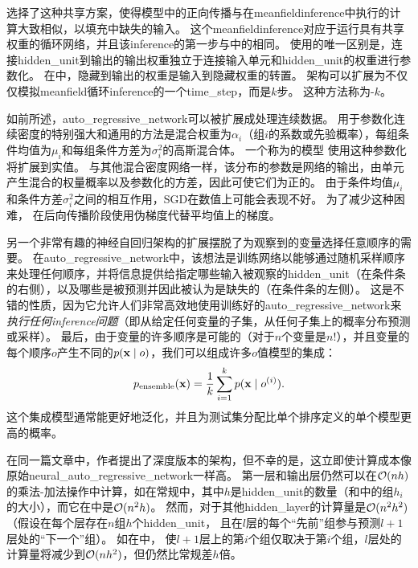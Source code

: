 
\citet{Larochelle+Murray-2011-small} 选择了这种共享方案，使得模型中的正向传播与在\gls{meanfield}\gls{inference}中执行的计算大致相似，以填充中缺失的输入。
这个\gls{meanfield}\gls{inference}对应于运行具有共享权重的循环网络，并且该\gls{inference}的第一步与中的相同。
使用的唯一区别是，连接\gls{hidden_unit}到输出的输出权重独立于连接输入单元和\gls{hidden_unit}的权重进行参数化。
在中，隐藏到输出的权重是输入到隐藏权重的转置。
架构可以扩展为不仅仅模拟\gls{meanfield}循环\gls{inference}的一个\gls{time_step}，而是$k$步。
这种方法称为-$k$\citep{Raiko-et-al-2014}。


如前所述，\gls{auto_regressive_network}可以被扩展成处理连续数据。
用于参数化连续密度的特别强大和通用的方法是混合权重为$\alpha_i$（组$i$的系数或先验概率），每组条件均值为$\mu_i$和每组条件方差为$\sigma_i^2$的高斯混合体。
一个称为的模型\citep{Benigno-et-al-NIPS2013-small} 使用这种参数化将扩展到实值。
与其他混合密度网络一样，该分布的参数是网络的输出，由单元产生混合的权量概率以及参数化的方差，因此可使它们为正的。
由于条件均值$\mu_i$和条件方差$\sigma_i^2$之间的相互作用，\gls{SGD}在数值上可能会表现不好。
为了减少这种困难， \citet{Benigno-et-al-NIPS2013-small}在后向传播阶段使用伪梯度代替平均值上的梯度。

另一个非常有趣的神经自回归架构的扩展摆脱了为观察到的变量选择任意顺序的需要\citep{Uria+al-ICML2014}。
在\gls{auto_regressive_network}中，该想法是训练网络以能够通过随机采样顺序来处理任何顺序，并将信息提供给指定哪些输入被观察的\gls{hidden_unit}（在条件条的右侧），以及哪些是被预测并因此被认为是缺失的（在条件条的左侧）。
这是不错的性质，因为它允许人们非常高效地使用训练好的\gls{auto_regressive_network}来\emph{执行任何\gls{inference}问题}（即从给定任何变量的子集，从任何子集上的概率分布预测或采样）。
最后，由于变量的许多顺序是可能的（对于$n$个变量是$n!$），并且变量的每个顺序$o$产生不同的$p(\mathbf{x} \mid o)$，我们可以组成许多$o$值模型的集成：
\begin{align}
 p_{\text{ensemble}}(\mathbf{x}) = \frac{1}{k} \sum_{i=1}^k p(\mathbf{x}  \mid  o^{(i)}).
\end{align}
这个集成模型通常能更好地泛化，并且为测试集分配比单个排序定义的单个模型更高的概率。


在同一篇文章中，作者提出了深度版本的架构，但不幸的是，这立即使计算成本像原始\gls{neural_auto_regressive_network}一样高\citep{Bengio+Bengio-NIPS2000}。
第一层和输出层仍然可以在$\mathcal{O}(nh)$的乘法-加法操作中计算，如在常规中，其中$h$是\gls{hidden_unit}的数量（和中的组$h_i$的大小），而它在\citet{Bengio+Bengio-NIPS2000}中是$\mathcal{O}(n^2h)$。
然而，对于其他\gls{hidden_layer}的计算量是$\mathcal{O}(n^2 h^2)$（假设在每个层存在$n$组$h$个\gls{hidden_unit}， 且在$l$层的每个``先前''组参与预测$l+1$层处的``下一个''组）。
如在\citet{Uria+al-ICML2014}中， 使$l+1$层上的第$i$个组仅取决于第$i$个组，$l$层处的计算量将减少到$\mathcal{O}(nh^2)$，但仍然比常规差$h$倍。


